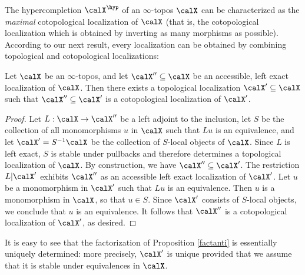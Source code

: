 The hypercompletion $\calX^{\hyp}$ of an $\infty$-topos $\calX$ can be characterized as the {\em maximal} cotopological localization of $\calX$ (that is, the cotopological localization which
is obtained by inverting as many morphisms as possible). According to our next result, every localization can be obtained by combining topological and cotopological localizations:

\begin{proposition}\label{factanti}
Let $\calX$ be an $\infty$-topos, and let $\calX'' \subseteq \calX$ be an accessible, left
exact localization of $\calX$. Then there exists a topological localization
$\calX' \subseteq \calX$ such that $\calX'' \subseteq \calX'$ is a cotopological localization
of $\calX'$.
\end{proposition}

\begin{proof}
Let $L: \calX \rightarrow \calX''$ be a left adjoint to the inclusion, let
$S$ be the collection of all monomorphisms $u$ in $\calX$ such that $Lu$ is an equivalence,
and let $\calX' = S^{-1} \calX$ be the collection of $S$-local objects of $\calX$. Since $L$ is left exact, $S$ is stable under pullbacks and therefore determines a topological localization of $\calX$. By construction, we have $\calX'' \subseteq \calX'$. The restriction $L| \calX'$ exhibits
$\calX''$ as an accessible left exact localization of $\calX'$. Let $u$ be a monomorphism
in $\calX'$ such that $Lu$ is an equivalence. Then $u$ is a monomorphism in $\calX$, so
that $u \in S$. Since $\calX'$ consists of $S$-local objects, we conclude that $u$ is an equivalence. It follows that $\calX''$ is a cotopological localization of $\calX'$, as desired.
\end{proof}

\begin{remark}
It is easy to see that the factorization of Proposition \ref{factanti} is essentially uniquely determined: more precisely, $\calX'$ is unique provided that we assume that it is stable under equivalences in $\calX$.
\end{remark}

